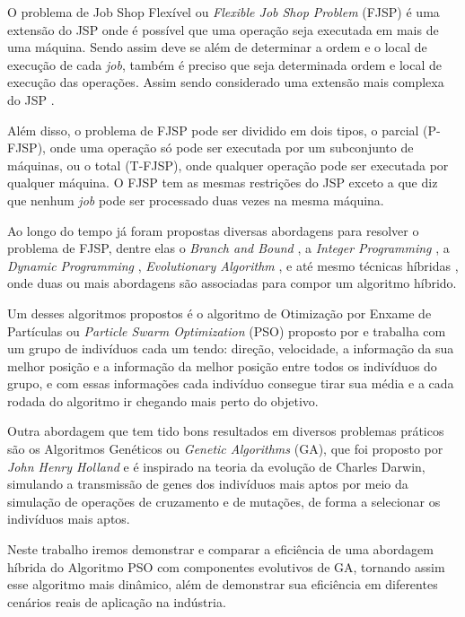 O problema de Job Shop Flexível ou \textit{Flexible Job Shop Problem} (FJSP) é uma extensão do JSP onde é possível que uma operação seja executada em mais de uma máquina. Sendo assim deve se além de determinar a ordem e o local de execução de cada \textit{job}, também é preciso que seja determinada ordem e local de execução das operações. Assim sendo considerado uma extensão mais complexa do JSP \cite{Jansen2000}. \newline

Além disso, o problema de FJSP pode ser dividido em dois tipos, o parcial (P-FJSP), onde uma operação só pode ser executada por um subconjunto de máquinas, ou o total (T-FJSP), onde qualquer operação pode ser executada por qualquer máquina. O FJSP tem as mesmas restrições do JSP exceto a que diz que nenhum \textit{job} pode ser processado duas vezes na mesma máquina. \newline

Ao longo do tempo já foram propostas diversas abordagens para resolver o problema de FJSP, dentre elas o \textit{Branch and Bound} \cite{Nababan2008}, a 
\textit{Integer Programming} \cite{Pan2007}, a 
\textit{Dynamic Programming} \cite{Gromicho2012}, 
\textit{Evolutionary Algorithm} \cite{Pezzella2008}, e até mesmo técnicas híbridas \cite{Zhang2009}, onde duas ou mais abordagens são associadas para compor um algoritmo híbrido. \newline

Um desses algoritmos propostos é o algoritmo de Otimização por Enxame de Partículas ou \textit{Particle Swarm Optimization} (PSO) proposto por \cite{Kennedy1995} e trabalha com um grupo de indivíduos cada um tendo: direção, velocidade, a informação da sua melhor posição e a informação da melhor posição entre todos os indivíduos do grupo, e com essas informações cada indivíduo consegue tirar sua média e a cada rodada do algoritmo ir chegando mais perto do objetivo. \newline

Outra abordagem que tem tido bons resultados em diversos problemas práticos \cite{Qing2012} são os Algoritmos Genéticos ou \textit{Genetic Algorithms} (GA), que foi proposto por \textit{John Henry Holland} e é inspirado na teoria da evolução de Charles Darwin, simulando a transmissão de genes dos indivíduos mais aptos por meio da simulação de operações de cruzamento e de mutações, de forma a selecionar os indivíduos mais aptos. \newline

Neste trabalho iremos demonstrar e comparar a eficiência de uma abordagem híbrida do Algoritmo PSO com componentes evolutivos de GA, tornando assim esse algoritmo mais dinâmico, além de demonstrar sua eficiência em diferentes cenários reais de aplicação na indústria.\newline

